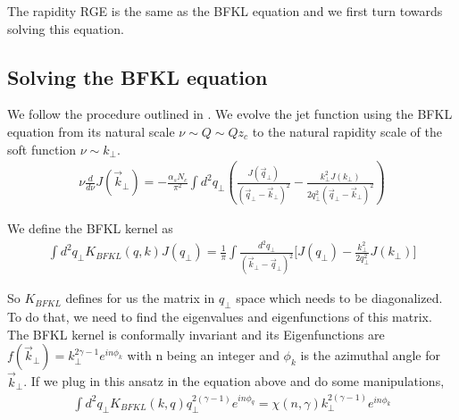 \documentclass[letter,11pt]{article}
\newcommand{\bea}{\begin{eqnarray}}
\newcommand{\eea}{\end{eqnarray}}
\begin{document}
The rapidity RGE is the same as the BFKL equation and we first turn towards solving this equation.

\subsection{Solving the BFKL equation}
We follow the procedure outlined in \cite{Kovchegov:2012mbw}. We evolve the jet function using the BFKL equation from its natural scale $\nu \sim Q \sim Qz_c$ to the natural rapidity scale of the soft function $\nu \sim k_{\perp}$.  
\bea
\nu\frac{d}{d\nu} J(\vec{k}_{\perp})= -\frac{\alpha_sN_c}{\pi^2}\int d^2q_{\perp} \left( \frac{J(\vec{q}_{\perp})}{(\vec{q}_{\perp}-\vec{k}_{\perp})^2} -\frac{k_{\perp}^2J(k_{\perp})}{2q_{\perp}^2(\vec{q}_{\perp}-\vec{k}_{\perp})^2}\right)
\eea

We define the BFKL kernel as 
\bea
\int d^2q_{\perp}K_{BFKL}(q,k) J(q_{\perp}) = \frac{1}{\pi} \int \frac{d^2q_{\perp}}{(\vec{k}_{\perp}-\vec{q}_{\perp})^2}\Bigg[J(q_{\perp})-\frac{k_{\perp}^2}{2q_{\perp}^2}J(k_{\perp})\Bigg] 
\eea

So $K_{BFKL}$ defines for us the matrix in $q_{\perp}$ space which needs to be diagonalized. To do that, we need to find the eigenvalues and eigenfunctions of this matrix. The BFKL kernel is conformally invariant and its Eigenfunctions are $f(\vec{k}_{\perp})=k_{\perp}^{2\gamma-1}e^{i n\phi_k}$ with n being an integer and $\phi_k$ is the azimuthal angle for $\vec{k}_{\perp}$. If we plug in this ansatz in the equation above and do some manipulations, 
\bea
 \int d^2q_{\perp}K_{BFKL}(k,q)q_{\perp}^{2(\gamma-1)}e^{in\phi_q}= \chi(n,\gamma)k_{\perp}^{2(\gamma-1)}e^{i n\phi_k}
\eea
\end{document}
